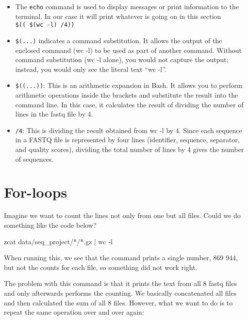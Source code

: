 \documentclass[
  letterpaper,
  DIV=11,
  numbers=noendperiod]{scrreprt}
\newenvironment{Shaded}{}{}
\newcommand{\AttributeTok}[1]{\textcolor[rgb]{0.84,0.23,0.29}{#1}}
\newcommand{\FunctionTok}[1]{\textcolor[rgb]{0.44,0.26,0.76}{#1}}
\newcommand{\KeywordTok}[1]{\textcolor[rgb]{0.84,0.23,0.29}{#1}}
\newcommand{\NormalTok}[1]{\textcolor[rgb]{0.14,0.16,0.18}{#1}}
\newcommand{\PreprocessorTok}[1]{\textcolor[rgb]{0.84,0.23,0.29}{#1}}
\providecommand{\tightlist}{%
  \setlength{\itemsep}{0pt}\setlength{\parskip}{0pt}}\usepackage{longtable,booktabs,array}
\begin{document}
\begin{tcolorbox}
\begin{itemize}
\tightlist
\item
  The \texttt{echo} command is used to display messages or print
  information to the terminal. In our case it will print whatever is
  going on in this section \texttt{\$((\ \$(wc\ -l)\ /4))}
\item
  \texttt{\$(...)} indicates a command substitution. It allows the
  output of the enclosed command (wc -l) to be used as part of another
  command. Without command substitution (wc -l alone), you would not
  capture the output; instead, you would only see the literal text ``wc
  -l''.
\item
  \texttt{\$((...))}: This is an arithmetic expansion in Bash. It allows
  you to perform arithmetic operations inside the brackets and
  substitute the result into the command line. In this case, it
  calculates the result of dividing the number of lines in the fastq
  file by 4.
\item
  \texttt{/4}: This is dividing the result obtained from wc -l by 4.
  Since each sequence in a FASTQ file is represented by four lines
  (identifier, sequence, separator, and quality scores), dividing the
  total number of lines by 4 gives the number of sequences.
\end{itemize}

\end{tcolorbox}

\section{For-loops}\label{for-loops}

Imagine we want to count the lines not only from one but all files.
Could we do something like the code below?

\begin{Shaded}
\begin{Highlighting}[]
\FunctionTok{zcat}\NormalTok{ data/seq\_project/}\PreprocessorTok{*}\NormalTok{/}\PreprocessorTok{*}\NormalTok{.gz }\KeywordTok{|} \FunctionTok{wc} \AttributeTok{{-}l}
\end{Highlighting}
\end{Shaded}

When running this, we see that the command prints a single number, 869
944, but not the counts for each file, so something did not work right.

The problem with this command is that it prints the text from all 8
fastq files and only afterwards performs the counting. We basically
concatenated all files and then calculated the sum of all 8 files.
However, what we want to do is to repeat the same operation over and
over again:
\end{document}
